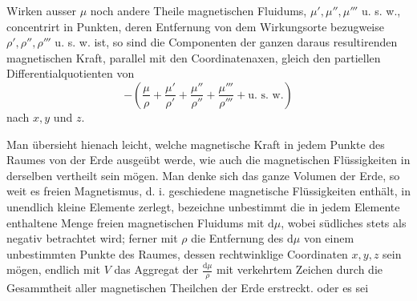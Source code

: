 Wirken ausser $\mu$ noch andere Theile magnetischen Fluidums, $\mu',\mu'',\mu'''$ u. s. w., concentrirt in Punkten, deren Entfernung von dem Wirkungsorte bezugweise $\rho',\rho'',\rho'''$ u. s. w. ist, so sind die Componenten der ganzen daraus resultirenden magnetischen Kraft, parallel mit den Coordinatenaxen, gleich den partiellen Differentialquotienten von
\[
-\left(\frac{\mu}{\rho}+\frac{\mu'}{\rho'}+\frac{\mu''}{\rho''}+\frac{\mu'''}{\rho'''}+\text{u. s. w.}\right)
\]
nach $x,y$ und $z$.

Man übersieht hienach leicht, welche magnetische Kraft in jedem Punkte des Raumes von der Erde ausgeübt werde, wie auch die magnetischen Flüssigkeiten in derselben vertheilt sein mögen. Man denke sich das ganze Volumen der Erde, so weit es freien Magnetismus, d. i. geschiedene magnetische Flüssigkeiten enthält, in unendlich kleine Elemente zerlegt, bezeichne unbestimmt die in jedem Elemente enthaltene Menge freien magnetischen Fluidums mit $\mathrm{d}\mu$, wobei südliches stets als negativ betrachtet wird; ferner mit $\rho$ die Entfernung des $\mathrm{d}\mu$ von einem unbestimmten Punkte des Raumes, dessen rechtwinklige Coordinaten $x,y,z$ sein mögen, endlich mit $V$ das Aggregat der $\frac{\mathrm{d}\mu}{\rho}$ mit verkehrtem Zeichen durch die Gesammtheit aller magnetischen Theilchen der Erde erstreckt. oder es sei
\par
\clearpage
